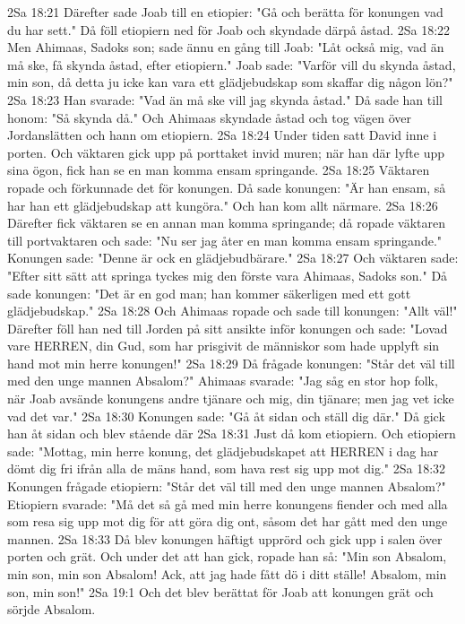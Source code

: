 2Sa 18:21  Därefter sade Joab till en etiopier: "Gå och berätta för konungen vad du har sett." Då föll etiopiern ned för Joab och skyndade därpå åstad.
2Sa 18:22  Men Ahimaas, Sadoks son; sade ännu en gång till Joab: "Låt också mig, vad än må ske, få skynda åstad, efter etiopiern." Joab sade: "Varför vill du skynda åstad, min son, då detta ju icke kan vara ett glädjebudskap som skaffar dig någon lön?"
2Sa 18:23  Han svarade: "Vad än må ske vill jag skynda åstad." Då sade han till honom: "Så skynda då." Och Ahimaas skyndade åstad och tog vägen över Jordanslätten och hann om etiopiern.
2Sa 18:24  Under tiden satt David inne i porten. Och väktaren gick upp på porttaket invid muren; när han där lyfte upp sina ögon, fick han se en man komma ensam springande.
2Sa 18:25  Väktaren ropade och förkunnade det för konungen. Då sade konungen: "Är han ensam, så har han ett glädjebudskap att kungöra." Och han kom allt närmare.
2Sa 18:26  Därefter fick väktaren se en annan man komma springande; då ropade väktaren till portvaktaren och sade: "Nu ser jag åter en man komma ensam springande." Konungen sade: "Denne är ock en glädjebudbärare."
2Sa 18:27  Och väktaren sade: "Efter sitt sätt att springa tyckes mig den förste vara Ahimaas, Sadoks son." Då sade konungen: "Det är en god man; han kommer säkerligen med ett gott glädjebudskap."
2Sa 18:28  Och Ahimaas ropade och sade till konungen: "Allt väl!" Därefter föll han ned till Jorden på sitt ansikte inför konungen och sade: "Lovad vare HERREN, din Gud, som har prisgivit de människor som hade upplyft sin hand mot min herre konungen!"
2Sa 18:29  Då frågade konungen: "Står det väl till med den unge mannen Absalom?" Ahimaas svarade: "Jag såg en stor hop folk, när Joab avsände konungens andre tjänare och mig, din tjänare; men jag vet icke vad det var."
2Sa 18:30  Konungen sade: "Gå åt sidan och ställ dig där." Då gick han åt sidan och blev stående där
2Sa 18:31  Just då kom etiopiern. Och etiopiern sade: "Mottag, min herre konung, det glädjebudskapet att HERREN i dag har dömt dig fri ifrån alla de mäns hand, som hava rest sig upp mot dig."
2Sa 18:32  Konungen frågade etiopiern: "Står det väl till med den unge mannen Absalom?" Etiopiern svarade: "Må det så gå med min herre konungens fiender och med alla som resa sig upp mot dig för att göra dig ont, såsom det har gått med den unge mannen.
2Sa 18:33  Då blev konungen häftigt upprörd och gick upp i salen över porten och grät. Och under det att han gick, ropade han så: "Min son Absalom, min son, min son Absalom! Ack, att jag hade fått dö i ditt ställe! Absalom, min son, min son!"
2Sa 19:1  Och det blev berättat för Joab att konungen grät och sörjde Absalom.
